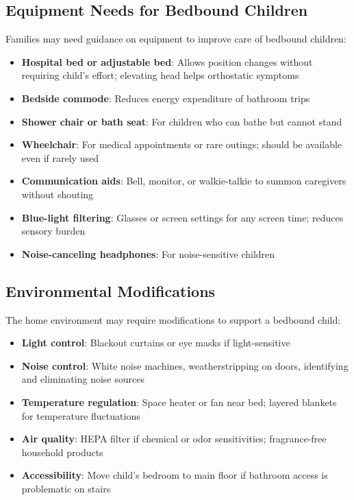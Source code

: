 \subsection{Equipment Needs for Bedbound Children}

Families may need guidance on equipment to improve care of bedbound children:

\begin{itemize}
    \item \textbf{Hospital bed or adjustable bed}: Allows position changes without requiring child's effort; elevating head helps orthostatic symptoms
    \item \textbf{Bedside commode}: Reduces energy expenditure of bathroom trips
    \item \textbf{Shower chair or bath seat}: For children who can bathe but cannot stand
    \item \textbf{Wheelchair}: For medical appointments or rare outings; should be available even if rarely used
    \item \textbf{Communication aids}: Bell, monitor, or walkie-talkie to summon caregivers without shouting
    \item \textbf{Blue-light filtering}: Glasses or screen settings for any screen time; reduces sensory burden
    \item \textbf{Noise-canceling headphones}: For noise-sensitive children
\end{itemize}

\subsection{Environmental Modifications}

The home environment may require modifications to support a bedbound child:

\begin{itemize}
    \item \textbf{Light control}: Blackout curtains or eye masks if light-sensitive
    \item \textbf{Noise control}: White noise machines, weatherstripping on doors, identifying and eliminating noise sources
    \item \textbf{Temperature regulation}: Space heater or fan near bed; layered blankets for temperature fluctuations
    \item \textbf{Air quality}: HEPA filter if chemical or odor sensitivities; fragrance-free household products
    \item \textbf{Accessibility}: Move child's bedroom to main floor if bathroom access is problematic on stairs
\end{itemize}

